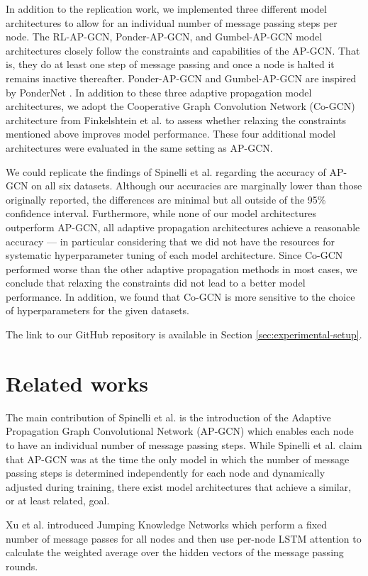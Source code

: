 \documentclass{gdl}
\begin{document}
In addition to the replication work, we implemented three different model architectures to allow for an individual number of message passing steps per node. The RL-AP-GCN, Ponder-AP-GCN, and Gumbel-AP-GCN model architectures closely follow the constraints and capabilities of the AP-GCN. That is, they do at least one step of message passing and once a node is halted it remains inactive thereafter. Ponder-AP-GCN and Gumbel-AP-GCN are inspired by PonderNet \cite{banino2021}. In addition to these three adaptive propagation model architectures, we adopt the Cooperative Graph Convolution Network (Co-GCN) architecture from Finkelshtein et al. \cite{finkelshtein2024} to assess whether relaxing the constraints mentioned above improves model performance. These four additional model architectures were evaluated in the same setting as AP-GCN.

We could replicate the findings of Spinelli et al. regarding the accuracy of AP-GCN on all six datasets. Although our accuracies are marginally lower than those originally reported, the differences are minimal but all outside of the 95\% confidence interval. 
Furthermore, while none of our model architectures outperform AP-GCN, all adaptive propagation architectures achieve a reasonable accuracy --- in particular considering that we did not have the resources for systematic hyperparameter tuning of each model architecture. Since Co-GCN performed worse than the other adaptive propagation methods in most cases, we conclude that relaxing the constraints did not lead to a better model performance. In addition, we found that Co-GCN is more sensitive to the choice of hyperparameters for the given datasets.

The link to our GitHub repository is available in Section \ref{sec:experimental-setup}.

\section{Related works}
The main contribution of Spinelli et al. is the introduction of the Adaptive Propagation Graph Convolutional Network (AP-GCN) which enables each node to have an individual number of message passing steps. While Spinelli et al. claim that AP-GCN was at the time the only model in which the number of message passing steps is determined independently for each node and dynamically adjusted during training, there exist model architectures that achieve a similar, or at least related, goal.

Xu et al. \cite{xu2018} introduced Jumping Knowledge Networks which perform a fixed number of message passes for all nodes and then use per-node LSTM attention to calculate the weighted average over the hidden vectors of the message passing rounds.   
\end{document}
